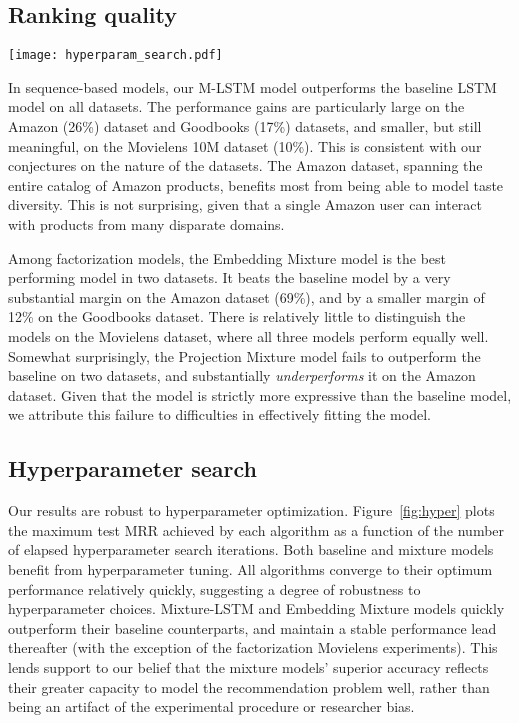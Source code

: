 \documentclass[sigconf]{acmart}
\begin{document}
\subsection{Ranking quality}
  \begin{figure*}[h!]
    \centering
    \captionsetup{width=.8\linewidth}
    \caption{Maximum test MRR vs number of hyperparameter search iterations. Sequence-based models in the top row; factorization-based models in the bottom row.}
    \label{fig:hyper}
    \texttt{[image: hyperparam\_search.pdf]}
  \end{figure*}
In sequence-based models, our M-LSTM model outperforms the baseline LSTM model on all datasets. The performance gains are particularly large on the Amazon (26\%) dataset and Goodbooks (17\%) datasets, and smaller, but still meaningful, on the Movielens 10M dataset (10\%). This is consistent with our conjectures on the nature of the datasets. The Amazon dataset, spanning the entire catalog of Amazon products, benefits most from being able to model taste diversity. This is not surprising, given that a single Amazon user can interact with products from many disparate domains.

Among factorization models, the Embedding Mixture model is the best performing model in two datasets. It beats the baseline model by a very substantial margin on the Amazon dataset (69\%), and by a smaller margin of 12\% on the Goodbooks dataset. There is relatively little to distinguish the models on the Movielens dataset, where all three models perform equally well. Somewhat surprisingly, the Projection Mixture model fails to outperform the baseline on two datasets, and substantially \emph{underperforms} it on the Amazon dataset. Given that the model is strictly more expressive than the baseline model, we attribute this failure to difficulties in effectively fitting the model.

\subsection{Hyperparameter search}
Our results are robust to hyperparameter optimization. Figure~\ref{fig:hyper} plots the maximum test MRR achieved by each algorithm as a function of the number of elapsed hyperparameter search iterations. Both baseline and mixture models benefit from hyperparameter tuning. All algorithms converge to their optimum performance relatively quickly, suggesting a degree of robustness to hyperparameter choices. Mixture-LSTM and Embedding Mixture models quickly outperform their baseline counterparts, and maintain a stable performance lead thereafter (with the exception of the factorization Movielens experiments). This lends support to our belief that the mixture models' superior accuracy reflects their greater capacity to model the recommendation problem well, rather than being an artifact of the experimental procedure or researcher bias.
\end{document}
